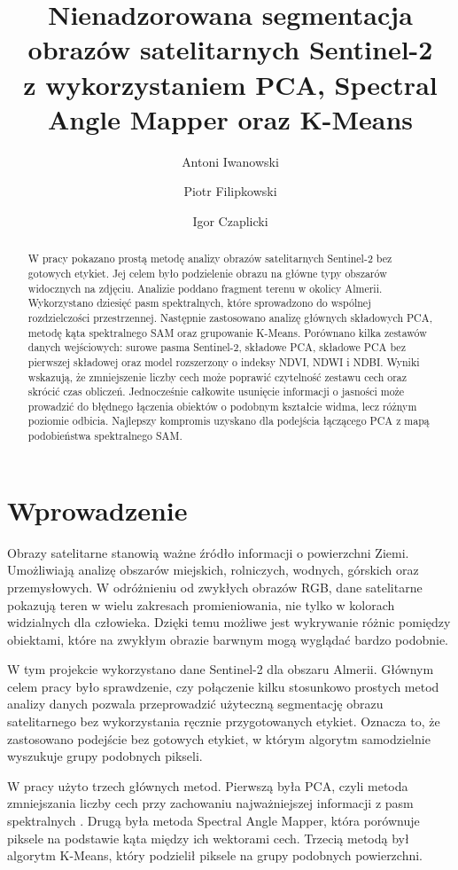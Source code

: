 \documentclass[12pt,a4paper]{article}
\title{
	Nienadzorowana segmentacja obrazów satelitarnych Sentinel-2\\
	z wykorzystaniem PCA, Spectral Angle Mapper oraz K-Means
}
\author{
	Antoni Iwanowski \and
	Piotr Filipkowski \and
	Igor Czaplicki
}
\date{}
\begin{document}
	
	\maketitle
	
	\begin{abstract}
		W pracy pokazano prostą metodę analizy obrazów satelitarnych Sentinel-2 bez gotowych etykiet. Jej celem było podzielenie obrazu na główne typy obszarów widocznych na zdjęciu. Analizie poddano fragment terenu w okolicy Almerii. Wykorzystano dziesięć pasm spektralnych, które sprowadzono do wspólnej rozdzielczości przestrzennej. Następnie zastosowano analizę głównych składowych PCA, metodę kąta spektralnego SAM oraz grupowanie K-Means. Porównano kilka zestawów danych wejściowych: surowe pasma Sentinel-2, składowe PCA, składowe PCA bez pierwszej składowej oraz model rozszerzony o indeksy NDVI, NDWI i NDBI. Wyniki wskazują, że zmniejszenie liczby cech może poprawić czytelność zestawu cech oraz skrócić czas obliczeń. Jednocześnie całkowite usunięcie informacji o jasności może prowadzić do błędnego łączenia obiektów o podobnym kształcie widma, lecz różnym poziomie odbicia. Najlepszy kompromis uzyskano dla podejścia łączącego PCA z mapą podobieństwa spektralnego SAM.
	\end{abstract}
	
	\section{Wprowadzenie}
	
	Obrazy satelitarne stanowią ważne źródło informacji o powierzchni Ziemi. Umożliwiają analizę obszarów miejskich, rolniczych, wodnych, górskich oraz przemysłowych. W odróżnieniu od zwykłych obrazów RGB, dane satelitarne pokazują teren w wielu zakresach promieniowania, nie tylko w kolorach widzialnych dla człowieka. Dzięki temu możliwe jest wykrywanie różnic pomiędzy obiektami, które na zwykłym obrazie barwnym mogą wyglądać bardzo podobnie.
	
	W tym projekcie wykorzystano dane Sentinel-2 dla obszaru Almerii. Głównym celem pracy było sprawdzenie, czy połączenie kilku stosunkowo prostych metod analizy danych pozwala przeprowadzić użyteczną segmentację obrazu satelitarnego bez wykorzystania ręcznie przygotowanych etykiet. Oznacza to, że zastosowano podejście bez gotowych etykiet, w którym algorytm samodzielnie wyszukuje grupy podobnych pikseli.
	
	W pracy użyto trzech głównych metod. Pierwszą była PCA, czyli metoda zmniejszania liczby cech przy zachowaniu najważniejszej informacji z pasm spektralnych \cite{malahat2024pca,deafricaPCA2021,kaluzna2020pca}. Drugą była metoda Spectral Angle Mapper, która porównuje piksele na podstawie kąta między ich wektorami cech. Trzecią metodą był algorytm K-Means, który podzielił piksele na grupy podobnych powierzchni.
\end{document}
